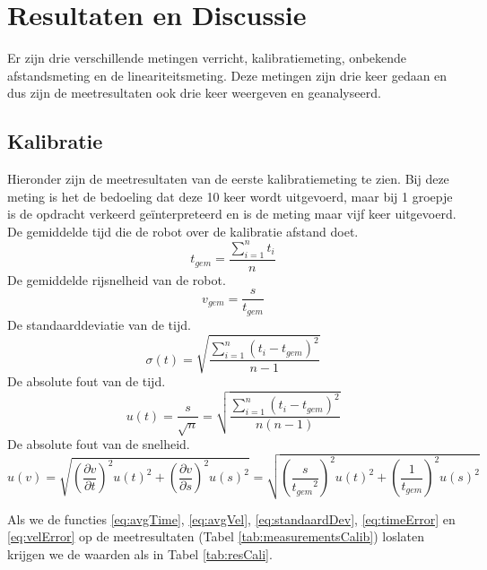 \documentclass{report}
\begin{document}
\chapter{Resultaten en Discussie}
Er zijn drie verschillende metingen verricht, kalibratiemeting, onbekende afstandsmeting en de lineariteitsmeting. Deze metingen zijn drie keer gedaan en dus zijn de meetresultaten ook drie keer weergeven en geanalyseerd.
\section{Kalibratie}
Hieronder zijn de meetresultaten van de eerste kalibratiemeting te zien. Bij deze meting is het de bedoeling dat deze 10 keer wordt uitgevoerd, maar bij 1 groepje is de opdracht verkeerd ge\"interpreteerd en is de meting maar vijf keer uitgevoerd.\\
\small{De gemiddelde tijd die de robot over de kalibratie afstand doet.}
\begin{equation}
\label{eq:avgTime}
t_{gem}=\frac{\sum_{i=1}^{n}t_i}{n}
\end{equation}
\small{De gemiddelde rijsnelheid van de robot.}
\begin{equation}
\label{eq:avgVel}
v_{gem} = \frac{s}{t_{gem}}
\end{equation}
\small{De standaarddeviatie van de tijd.}
\begin{equation}
\label{eq:standaardDev}
\sigma(t) = \sqrt{\frac{\sum_{i=1}^{n}( t_i-t_{gem})^2}{n-1}}
\end{equation}
\small{De absolute fout van de tijd.}
\begin{equation}
\label{eq:timeError}
u(t) = \frac{s}{\sqrt{n}} = \sqrt{\frac{\sum_{i=1}^{n}( t_i-t_{gem})^2}{n(n-1)}}
\end{equation}
\small{De absolute fout van de snelheid.}
\begin{equation}
\label{eq:velError}
u(v) = \sqrt{\left (\frac{\partial v }{\partial t }\right)^2 u(t)^2 + \left (\frac{\partial v }{\partial s }\right)^2 u(s)^2} = \sqrt{\left (\frac{s }{{t_{gem}}^2 }\right)^2 u(t)^2 + \left (\frac{1}{t_{gem} }\right)^2 u(s)^2}
\end{equation}

Als we de functies \ref{eq:avgTime},  \ref{eq:avgVel},  \ref{eq:standaardDev},  \ref{eq:timeError} en  \ref{eq:velError} op de meetresultaten (Tabel \ref{tab:measurementsCalib}) loslaten krijgen we de waarden als in Tabel \ref{tab:resCali}.
\end{document}
